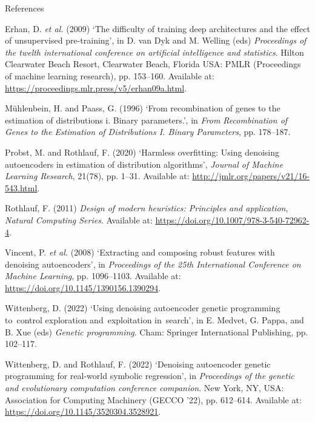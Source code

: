 \documentclass[
  ignorenonframetext,
]{beamer}
\newlength{\cslhangindent}
\newlength{\cslentryspacingunit} %
\newenvironment{CSLReferences}[2] %
 {%
  \setlength{\parindent}{0pt}
  \ifodd #1
  \let\oldpar\par
  \def\par{\hangindent=\cslhangindent\oldpar}
  \fi
  \setlength{\parskip}{#2\cslentryspacingunit}
 }%
 {}
\begin{document}
\begin{frame}[allowframebreaks]{References}
\hypertarget{refs}{}
\begin{CSLReferences}{0}{0}
\leavevmode{}%
Erhan, D. \emph{et al.} (2009) {`The difficulty of training deep
architectures and the effect of unsupervised pre-training'}, in D. van
Dyk and M. Welling (eds) \emph{Proceedings of the twelth international
conference on artificial intelligence and statistics}. Hilton Clearwater
Beach Resort, Clearwater Beach, Florida USA: PMLR (Proceedings of
machine learning research), pp. 153--160. Available at:
\url{https://proceedings.mlr.press/v5/erhan09a.html}.

\leavevmode{}%
Mühlenbein, H. and Paass, G. (1996) {`From recombination of genes to the
estimation of distributions i. Binary parameters.'}, in \emph{From
Recombination of Genes to the Estimation of Distributions I. Binary
Parameters}, pp. 178--187.

\leavevmode{}%
Probst, M. and Rothlauf, F. (2020) {`Harmless overfitting: Using
denoising autoencoders in estimation of distribution algorithms'},
\emph{Journal of Machine Learning Research}, 21(78), pp. 1--31.
Available at: \url{http://jmlr.org/papers/v21/16-543.html}.

\leavevmode{}%
Rothlauf, F. (2011) \emph{Design of modern heuristics: Principles and
application}, \emph{Natural Computing Series}. Available at:
\url{https://doi.org/10.1007/978-3-540-72962-4}.

\leavevmode{}%
Vincent, P. \emph{et al.} (2008) {`Extracting and composing robust
features with denoising autoencoders'}, in \emph{Proceedings of the 25th
International Conference on Machine Learning}, pp. 1096--1103. Available
at: \url{https://doi.org/10.1145/1390156.1390294}.

\leavevmode{}%
Wittenberg, D. (2022) {`Using denoising autoencoder genetic programming
to~control exploration and~exploitation in~search'}, in E. Medvet, G.
Pappa, and B. Xue (eds) \emph{Genetic programming}. Cham: Springer
International Publishing, pp. 102--117.

\leavevmode{}%
Wittenberg, D. and Rothlauf, F. (2022) {`Denoising autoencoder genetic
programming for real-world symbolic regression'}, in \emph{Proceedings
of the genetic and evolutionary computation conference companion}. New
York, NY, USA: Association for Computing Machinery (GECCO '22), pp.
612--614. Available at: \url{https://doi.org/10.1145/3520304.3528921}.


\end{CSLReferences}
\end{frame}
\end{document}
